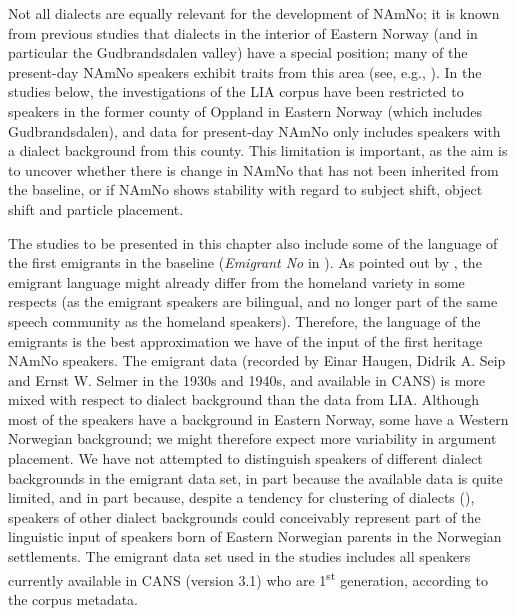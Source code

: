 \documentclass[output=paper]{langscibook}
\begin{document}
Not all dialects are equally relevant for the development of NAmNo; it is known from previous studies that dialects in the interior of Eastern Norway (and in particular the Gudbrandsdalen valley) have a special position; many of the present-day NAmNo speakers exhibit traits from this area (see, e.g., ). In the studies below, the investigations of the LIA corpus have been restricted to speakers in the former county of Oppland in Eastern Norway (which includes Gudbrandsdalen), and data for present-day NAmNo only includes speakers with a dialect background from this county. This limitation is important, as the aim is to uncover whether there is change in NAmNo that has not been inherited from the baseline, or if NAmNo shows stability with regard to subject shift, object shift and particle placement. 

The studies to be presented in this chapter also include some of the language of the first emigrants in the baseline (\textit{Emigrant No} in ). As pointed out by \citet[14]{Polinsky2018}, the emigrant language might already differ from the homeland variety in some respects (as the emigrant speakers are bilingual, and no longer part of the same speech community as the homeland speakers). Therefore, the language of the emigrants is the best approximation we have of the input of the first heritage NAmNo speakers. The emigrant data (recorded by Einar Haugen, Didrik A. Seip and Ernst W. Selmer in the 1930s and 1940s, and available in CANS) is more mixed with respect to dialect background than the data from LIA. Although most of the speakers have a background in Eastern Norway, some have a Western Norwegian background; we might therefore expect more variability in argument placement. We have not attempted to distinguish speakers of different dialect backgrounds in the emigrant data set, in part because the available data is quite limited, and in part because, despite a tendency for clustering of dialects (), speakers of other dialect backgrounds could conceivably represent part of the linguistic input of speakers born of Eastern Norwegian parents in the Norwegian settlements. The emigrant data set used in the studies includes all speakers currently available in CANS (version 3.1) who are 1\textsuperscript{st} generation, according to the corpus metadata.
\end{document}
